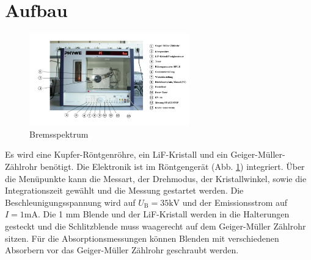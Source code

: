 \section{Aufbau}
\label{sec:aufbau}
\begin{figure}
    \centering
    \includegraphics[height=4.0cm]{data/abb4.jpg}
    \caption{Bremsspektrum \cite{V602}}
    \label{fig:abb4}
\end{figure}
Es wird eine Kupfer-Röntgenröhre, ein LiF-Kristall und ein Geiger-Müller-Zählrohr benötigt.
Die Elektronik ist im Röntgengerät (Abb. \ref{fig:abb4}) integriert.
Über die Menüpunkte kann die Messart, der Drehmodus, der Kristallwinkel, sowie die Integrationszeit gewählt und die Messung gestartet werden.
Die Beschleunigungsspannung wird auf $U_\text{B} = 35 \text{kV}$ und der Emissionsstrom auf $I = 1 \text{mA}$.
Die 1 mm Blende und der LiF-Kristall werden in die Halterungen gesteckt und die Schlitzblende muss waagerecht auf dem Geiger-Müller Zählrohr sitzen.
Für die Absorptionsmessungen können Blenden mit verschiedenen Absorbern vor das Geiger-Müller Zählrohr geschraubt werden.

